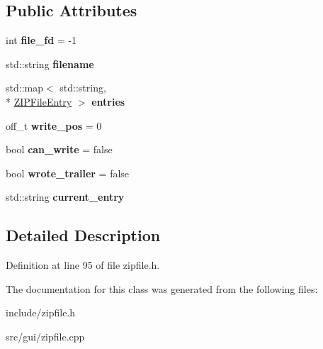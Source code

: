 \subsection*{Public Attributes}
\begin{DoxyCompactItemize}
\item 
\hypertarget{classZIPFile_ae581a37afec038d41a680b6b3afdad03}{int {\bfseries file\-\_\-fd} = -\/1}\label{classZIPFile_ae581a37afec038d41a680b6b3afdad03}

\item 
\hypertarget{classZIPFile_ac3dba77addfc3d489d323a87ca41e44f}{std\-::string {\bfseries filename}}\label{classZIPFile_ac3dba77addfc3d489d323a87ca41e44f}

\item 
\hypertarget{classZIPFile_a4eeeee852916775da8751c71264b08ef}{std\-::map$<$ std\-::string, \\*
\hyperlink{classZIPFileEntry}{Z\-I\-P\-File\-Entry} $>$ {\bfseries entries}}\label{classZIPFile_a4eeeee852916775da8751c71264b08ef}

\item 
\hypertarget{classZIPFile_addf0ecfef3c567c854263a41141c6e4f}{off\-\_\-t {\bfseries write\-\_\-pos} = 0}\label{classZIPFile_addf0ecfef3c567c854263a41141c6e4f}

\item 
\hypertarget{classZIPFile_a00441bb7cbff51d7a5caf5a3bb4c0461}{bool {\bfseries can\-\_\-write} = false}\label{classZIPFile_a00441bb7cbff51d7a5caf5a3bb4c0461}

\item 
\hypertarget{classZIPFile_a6bc04a1c4fb2ddbd52ef7ab0a96f2667}{bool {\bfseries wrote\-\_\-trailer} = false}\label{classZIPFile_a6bc04a1c4fb2ddbd52ef7ab0a96f2667}

\item 
\hypertarget{classZIPFile_abd2413b5dc4a72367ce0f424ed245369}{std\-::string {\bfseries current\-\_\-entry}}\label{classZIPFile_abd2413b5dc4a72367ce0f424ed245369}

\end{DoxyCompactItemize}


\subsection{Detailed Description}


Definition at line 95 of file zipfile.\-h.



The documentation for this class was generated from the following files\-:\begin{DoxyCompactItemize}
\item 
include/zipfile.\-h\item 
src/gui/zipfile.\-cpp\end{DoxyCompactItemize}

